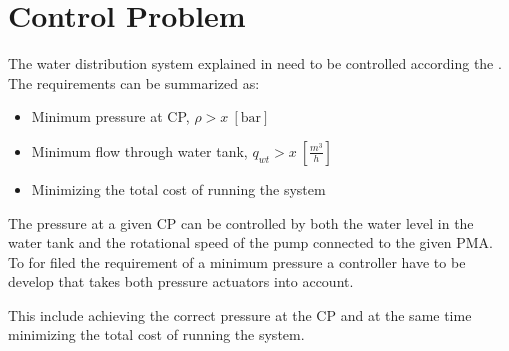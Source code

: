 \section{Control Problem}
\label{control_problem}

The water distribution system explained in  need to be controlled according the . The requirements can be summarized as: 

\begin{itemize}
	\item Minimum pressure at CP, $\rho > x \:[\text{bar}]$
	\item Minimum flow through water tank, $q_{wt} > x \:[\frac{m^3}{h}]$
	\item Minimizing the total cost of running the system
\end{itemize}

The pressure at a given CP can be controlled by both the water level in the water tank and the rotational speed of the pump connected to the given PMA. To for filed the requirement of a minimum pressure a controller have to be develop that takes both pressure actuators into account.



This include achieving the correct pressure at the CP and at the same time minimizing the total cost of running the system. 